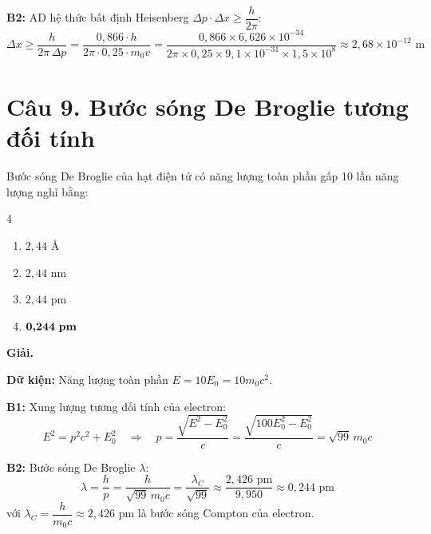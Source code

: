 \documentclass[11pt,a4paper]{article}
\begin{document}
\textbf{B2:} AD hệ thức bất định Heisenberg $\Delta p \cdot \Delta x \ge \dfrac{h}{2\pi}$:
\begin{equation*}
    \Delta x \ge \frac{h}{2\pi \, \Delta p} = \frac{0{,}866 \cdot h}{2\pi \cdot 0{,}25 \cdot m_0 v} = \frac{0{,}866 \times 6{,}626 \times 10^{-34}}{2\pi \times 0{,}25 \times 9{,}1 \times 10^{-31} \times 1{,}5 \times 10^8} \approx 2{,}68 \times 10^{-12}\text{ m}
\end{equation*}

\vspace{0.5cm}

\section*{Câu 9. Bước sóng De Broglie tương đối tính}

Bước sóng De Broglie của hạt điện tử có năng lượng toàn phần gấp 10 lần năng lượng nghỉ bằng:

\begin{multicols}{4}
\begin{enumerate}[label=\Alph*., itemsep=1pt, topsep=1pt, parsep=0pt, leftmargin=1.8em]
    \item $2{,}44\text{ \AA}$
    \item $2{,}44\text{ nm}$
    \item $2{,}44\text{ pm}$
    \item $\boldsymbol{0{,}244\text{ \textbf{pm}}}$
\end{enumerate}
\end{multicols}

\textbf{Giải.}

\textbf{Dữ kiện:} Năng lượng toàn phần $E = 10 E_0 = 10 m_0 c^2$.

\textbf{B1:} Xung lượng tương đối tính của electron:
\begin{equation*}
    E^2 = p^2 c^2 + E_0^2 \quad \Longrightarrow \quad p = \frac{\sqrt{E^2 - E_0^2}}{c} = \frac{\sqrt{100 E_0^2 - E_0^2}}{c} = \sqrt{99}\, m_0 c
\end{equation*}

\textbf{B2:} Bước sóng De Broglie $\lambda$:
\begin{equation*}
    \lambda = \frac{h}{p} = \frac{h}{\sqrt{99}\, m_0 c} = \frac{\lambda_C}{\sqrt{99}} \approx \frac{2{,}426\text{ pm}}{9{,}950} \approx 0{,}244\text{ pm}
\end{equation*}
với $\lambda_C = \dfrac{h}{m_0 c} \approx 2{,}426\text{ pm}$ là bước sóng Compton của electron.
\end{document}
